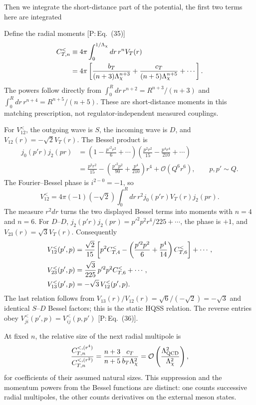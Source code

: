 \documentclass[11pt,a4paper]{article}
\newcommand{\tagP}[1]{\textcolor{blue!65!black}{\textsf{\small[P:\,#1]}}}
\newenvironment{aiadd}{\par}{\par}
\begin{document}
Then we integrate the short-distance part of the potential, the first two terms here are integrated
\begin{aiadd}
	Define the radial moments \tagP{Eq.~(35)}
	\begin{align}
		C^<_{T,n}
		&\equiv4\pi\int_0^{1/\Lambda_\chi}dr\,r^n V_T(r)\notag\\
		&=4\pi\left[
		\frac{b_T}{(n+3)\Lambda_\chi^{n+3}}
		+\frac{c_T}{(n+5)\Lambda_\chi^{n+5}}+\cdots\right].
		\label{eq:pc-tensor-moments}
	\end{align}
	The powers follow directly from
	$\int_0^Rdr\,r^{n+2}=R^{n+3}/(n+3)$ and
	$\int_0^Rdr\,r^{n+4}=R^{n+5}/(n+5)$.
	These are short-distance moments in this matching prescription, not
	regulator-independent measured couplings.

	For $V^<_{12}$, the outgoing wave is $S$, the incoming wave is $D$,
	and $V_{12}(r)=-\sqrt2V_T(r)$. The Bessel product is
	\begin{align*}
		j_0(p'r)j_2(pr)
		&=\left(1-\frac{p'^2r^2}{6}+\cdots\right)
		\left(\frac{p^2r^2}{15}-\frac{p^4r^4}{210}+\cdots\right)\\
		&=\frac{p^2r^2}{15}
		-\left(\frac{p'^2p^2}{90}+\frac{p^4}{210}\right)r^4
		+\mathcal O(Q^6r^6),\qquad p,p'\sim Q.
	\end{align*}
	The Fourier--Bessel phase is $i^{2-0}=-1$, so
	\[
		V^<_{12}
		=4\pi(-1)(-\sqrt2)\int_0^Rdr\,r^2
		j_0(p'r)V_T(r)j_2(pr).
	\]
	The measure $r^2dr$ turns the two displayed Bessel terms into moments
	with $n=4$ and $n=6$. For $D$--$D$,
	$j_2(p'r)j_2(pr)=p'^2p^2r^4/225+\cdots$, the phase is $+1$, and
	$V_{23}(r)=\sqrt3V_T(r)$. Consequently
	\begin{align}
		V^<_{12}(p',p)
		&=\frac{\sqrt2}{15}\left[
		p^2C^<_{T,4}
		-\left(\frac{p'^2p^2}{6}+\frac{p^4}{14}\right)C^<_{T,6}
		\right]+\cdots,\notag\\
		V^<_{23}(p',p)
		&=\frac{\sqrt3}{225}\,p'^2p^2C^<_{T,6}+\cdots,\notag\\
		V^<_{13}(p',p)&=-\sqrt3\,V^<_{12}(p',p).
		\label{eq:pc-offdiagonal}
	\end{align}
	The last relation follows from
	$V_{13}(r)/V_{12}(r)=\sqrt6/(-\sqrt2)=-\sqrt3$ and identical
	$S$--$D$ Bessel factors; this is the static HQSS relation.
	The reverse entries obey $V^<_{ji}(p',p)=V^<_{ij}(p,p')$
	\tagP{Eq.~(36)}.

	At fixed $n$, the relative size of the next radial multipole is
	\[
		\frac{C^{<,(r^4)}_{T,n}}{C^{<,(r^2)}_{T,n}}
		=\frac{n+3}{n+5}\frac{c_T}{b_T\Lambda_\chi^2}
		=\mathcal O\left(\frac{\Lambda_{\rm QCD}^2}{\Lambda_\chi^2}\right),
	\]
	for coefficients of their assumed natural sizes.
	This suppression and the momentum powers from the Bessel functions
	are distinct: one counts successive radial multipoles, the other
	counts derivatives on the external meson states.
\end{aiadd}
\end{document}
